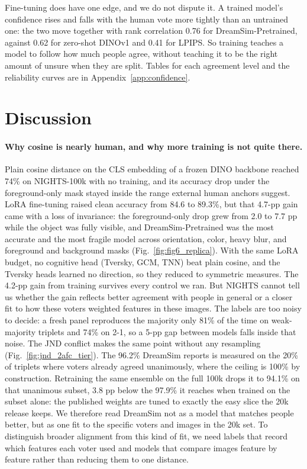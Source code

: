 \documentclass{article}
\begin{document}
Fine-tuning does have one edge, and we do not dispute it. A trained model's confidence rises and falls with the human vote more tightly than an untrained one: the two move together with rank correlation 0.76 for DreamSim-Pretrained, against 0.62 for zero-shot DINOv1 and 0.41 for LPIPS. So training teaches a model to follow how much people agree, without teaching it to be the right amount of unsure when they are split. Tables for each agreement level and the reliability curves are in Appendix~\ref{app:confidence}.

\section{Discussion}
\label{sec:discussion}

\paragraph{Why cosine is nearly human, and why more training is not quite there.} Plain cosine distance on the CLS embedding of a frozen DINO backbone reached 74\% on NIGHTS-100k with no training, and its accuracy drop under the foreground-only mask stayed inside the range external human anchors suggest. LoRA fine-tuning raised clean accuracy from 84.6 to 89.3\%, but that 4.7-pp gain came with a loss of invariance: the foreground-only drop grew from 2.0 to 7.7 pp while the object was fully visible, and DreamSim-Pretrained was the most accurate and the most fragile model across orientation, color, heavy blur, and foreground and background masks (Fig.~\ref{fig:fig6_replica}). With the same LoRA budget, no cognitive head (Tversky, GCM, TNN) beat plain cosine, and the Tversky heads learned no direction, so they reduced to symmetric measures. The 4.2-pp gain from training survives every control we ran. But NIGHTS cannot tell us whether the gain reflects better agreement with people in general or a closer fit to how these voters weighted features in these images. The labels are too noisy to decide: a fresh panel reproduces the majority only 81\% of the time on weak-majority triplets and 74\% on 2-1, so a 5-pp gap between models falls inside that noise. The JND conflict makes the same point without any resampling (Fig.~\ref{fig:jnd_2afc_tier}). The 96.2\% DreamSim reports is measured on the 20\% of triplets where voters already agreed unanimously, where the ceiling is 100\% by construction. Retraining the same ensemble on the full 100k drops it to 94.1\% on that unanimous subset, 3.8 pp below the 97.9\% it reaches when trained on the subset alone: the published weights are tuned to exactly the easy slice the 20k release keeps. We therefore read DreamSim not as a model that matches people better, but as one fit to the specific voters and images in the 20k set. To distinguish broader alignment from this kind of fit, we need labels that record which features each voter used and models that compare images feature by feature rather than reducing them to one distance.
\end{document}
